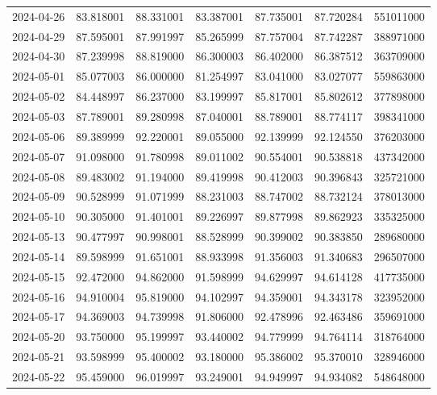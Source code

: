 \begin{tabular}{lrrrrrr}
2024-04-26 &   83.818001 &   88.331001 &   83.387001 &   87.735001 &   87.720284 &   551011000 \\
2024-04-29 &   87.595001 &   87.991997 &   85.265999 &   87.757004 &   87.742287 &   388971000 \\
2024-04-30 &   87.239998 &   88.819000 &   86.300003 &   86.402000 &   86.387512 &   363709000 \\
2024-05-01 &   85.077003 &   86.000000 &   81.254997 &   83.041000 &   83.027077 &   559863000 \\
2024-05-02 &   84.448997 &   86.237000 &   83.199997 &   85.817001 &   85.802612 &   377898000 \\
2024-05-03 &   87.789001 &   89.280998 &   87.040001 &   88.789001 &   88.774117 &   398341000 \\
2024-05-06 &   89.389999 &   92.220001 &   89.055000 &   92.139999 &   92.124550 &   376203000 \\
2024-05-07 &   91.098000 &   91.780998 &   89.011002 &   90.554001 &   90.538818 &   437342000 \\
2024-05-08 &   89.483002 &   91.194000 &   89.419998 &   90.412003 &   90.396843 &   325721000 \\
2024-05-09 &   90.528999 &   91.071999 &   88.231003 &   88.747002 &   88.732124 &   378013000 \\
2024-05-10 &   90.305000 &   91.401001 &   89.226997 &   89.877998 &   89.862923 &   335325000 \\
2024-05-13 &   90.477997 &   90.998001 &   88.528999 &   90.399002 &   90.383850 &   289680000 \\
2024-05-14 &   89.598999 &   91.651001 &   88.933998 &   91.356003 &   91.340683 &   296507000 \\
2024-05-15 &   92.472000 &   94.862000 &   91.598999 &   94.629997 &   94.614128 &   417735000 \\
2024-05-16 &   94.910004 &   95.819000 &   94.102997 &   94.359001 &   94.343178 &   323952000 \\
2024-05-17 &   94.369003 &   94.739998 &   91.806000 &   92.478996 &   92.463486 &   359691000 \\
2024-05-20 &   93.750000 &   95.199997 &   93.440002 &   94.779999 &   94.764114 &   318764000 \\
2024-05-21 &   93.598999 &   95.400002 &   93.180000 &   95.386002 &   95.370010 &   328946000 \\
2024-05-22 &   95.459000 &   96.019997 &   93.249001 &   94.949997 &   94.934082 &   548648000 \\

\end{tabular}
